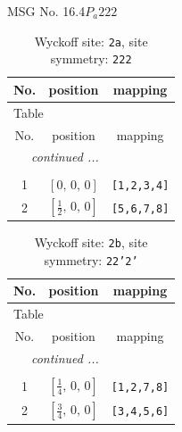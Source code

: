 \documentclass[fleqn,8pt]{jsarticle}
\begin{document}
\setcounter{MaxMatrixCols}{32}

\renewcommand{\tablename}{Table~}
\renewcommand{\figurename}{Figure~}
\begin{center}
\LARGE
MSG No. 16.4\quad$P_{a}222$
\end{center}
\renewcommand{\arraystretch}{1.2}
\begin{longtable}{ccc}
\caption{Wyckoff site: {\tt 2a}, site symmetry: {\tt 222}}
 \\
 \hline \hline
No. & position & mapping \\ \hline \endfirsthead

\multicolumn{2}{l}{\tablename\ \thetable{}} \\
 \hline \hline
No. & position & mapping \\ \hline \endhead

 \hline \hline
\multicolumn{2}{r}{\footnotesize\it continued ...} \\ \endfoot

 \hline \hline
\multicolumn{2}{r}{} \\ \endlastfoot

1 & $\left[ 0,\, 0,\, 0 \right]$ & {\tt [1,2,3,4]} \\ \hline
2 & $\left[ \frac{1}{2},\, 0,\, 0 \right]$ & {\tt [5,6,7,8]} \\
\end{longtable}
\renewcommand{\arraystretch}{1.2}
\begin{longtable}{ccc}
\caption{Wyckoff site: {\tt 2b}, site symmetry: {\tt 22'2'}}
 \\
 \hline \hline
No. & position & mapping \\ \hline \endfirsthead

\multicolumn{2}{l}{\tablename\ \thetable{}} \\
 \hline \hline
No. & position & mapping \\ \hline \endhead

 \hline \hline
\multicolumn{2}{r}{\footnotesize\it continued ...} \\ \endfoot

 \hline \hline
\multicolumn{2}{r}{} \\ \endlastfoot

1 & $\left[ \frac{1}{4},\, 0,\, 0 \right]$ & {\tt [1,2,7,8]} \\ \hline
2 & $\left[ \frac{3}{4},\, 0,\, 0 \right]$ & {\tt [3,4,5,6]} \\
\end{longtable}
\renewcommand{\arraystretch}{1.2}
\end{document}
